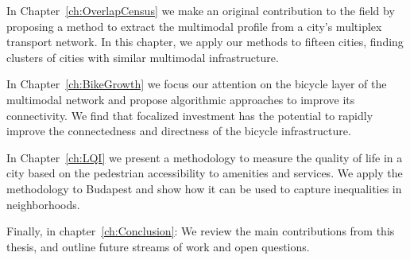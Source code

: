 In Chapter~\ref{ch:OverlapCensus} we make an original contribution to the field by proposing a method to extract the multimodal profile from a city's multiplex transport network. In this chapter, we apply our methods to fifteen cities, finding clusters of cities with similar multimodal infrastructure.

In Chapter~\ref{ch:BikeGrowth} we focus our attention on the bicycle layer of the multimodal network and propose algorithmic approaches to improve its connectivity. We find that focalized investment has the potential to rapidly improve the connectedness and directness of the bicycle infrastructure.

In Chapter~\ref{ch:LQI} we present a methodology to measure the quality of life in a city based on the pedestrian accessibility to amenities and services. We apply the methodology to Budapest and show how it can be used to capture inequalities in neighborhoods.

Finally, in chapter~\ref{ch:Conclusion}: We review the main contributions from this thesis, and outline future streams of work and open questions. 